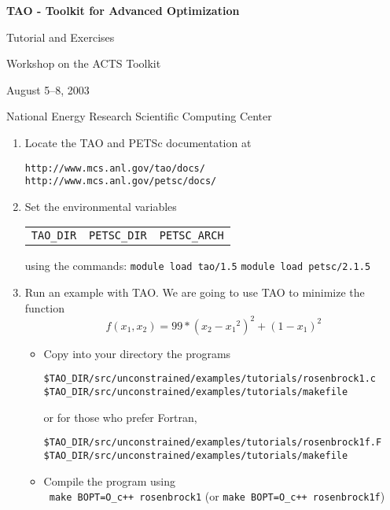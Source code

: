 \documentclass[11pt]{article}
\begin{document}
\begin{center}
{\bf
TAO - Toolkit for Advanced Optimization
        
Tutorial and Exercises

\vspace{0.25in}

Workshop on the ACTS Toolkit

August 5--8, 2003

National Energy Research Scientific Computing Center
}
\end{center}
\vspace{0.25in}

\begin{enumerate}

\item Locate the TAO and PETSc documentation at 
\begin{alltt}
http://www.mcs.anl.gov/tao/docs/
http://www.mcs.anl.gov/petsc/docs/
\end{alltt}

\item Set the environmental variables\\
\begin{tabular}{ccc}
\texttt{TAO\_DIR} & \texttt{PETSC\_DIR} & \texttt{PETSC\_ARCH} 
\end{tabular}
using the commands:
\quad \texttt{module load tao/1.5}
\quad \texttt{module load petsc/2.1.5}


\item Run an example with TAO.
We are going to use TAO to minimize the function 
\[
    f(x_1,x_2) = 99*(x_2-{x_1}^2)^2 + (1-x_1)^2 
\]

\begin{itemize}
 \item Copy into your directory the programs
  \begin{alltt}
    \$TAO_DIR/src/unconstrained/examples/tutorials/rosenbrock1.c
    \$TAO_DIR/src/unconstrained/examples/tutorials/makefile
  \end{alltt}
  or for those who prefer Fortran,
  \begin{alltt}
    \$TAO_DIR/src/unconstrained/examples/tutorials/rosenbrock1f.F
    \$TAO_DIR/src/unconstrained/examples/tutorials/makefile
  \end{alltt}

 \item Compile the program using \\
  \quad \texttt{ make BOPT=O\_c++ rosenbrock1} 
  (or \texttt{make BOPT=O\_c++ rosenbrock1f})


\end{itemize}
\end{enumerate}
\end{document}
